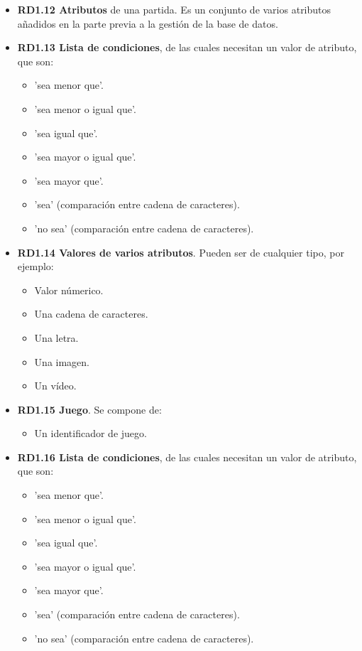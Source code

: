\begin{itemize}
	\item \textbf{RD1.12 Atributos} de una partida. Es un conjunto de varios atributos añadidos en la parte previa a la gestión de la base de datos.
	
	\item \textbf{RD1.13 Lista de condiciones}, de las cuales necesitan un valor de atributo, que son:
	\begin{itemize}
		\item 'sea menor que'.
		\item 'sea menor o igual que'.
		\item 'sea igual que'.
		\item 'sea mayor o igual que'.
		\item 'sea mayor que'.
		\item 'sea' (comparación entre cadena de caracteres).
		\item 'no sea' (comparación entre cadena de caracteres).
	\end{itemize}
	
	\item \textbf{RD1.14 Valores de varios atributos}. Pueden ser de cualquier tipo, por ejemplo:
	\begin{itemize}
		\item Valor númerico.
		\item Una cadena de caracteres.
		\item Una letra.
		\item Una imagen.
		\item Un vídeo.
	\end{itemize}
	
	\item \textbf{RD1.15 Juego}. Se compone de:
	\begin{itemize}
		\item Un identificador de juego.
	\end{itemize}
	
	\item \textbf{RD1.16 Lista de condiciones}, de las cuales necesitan un valor de atributo, que son:
	\begin{itemize}
		\item 'sea menor que'.
		\item 'sea menor o igual que'.
		\item 'sea igual que'.
		\item 'sea mayor o igual que'.
		\item 'sea mayor que'.
		\item 'sea' (comparación entre cadena de caracteres).
		\item 'no sea' (comparación entre cadena de caracteres).
	\end{itemize}
	

\end{itemize}
